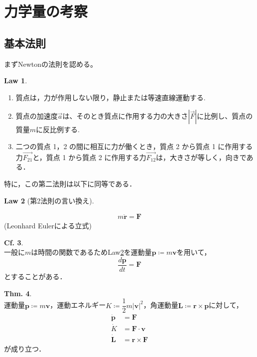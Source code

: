 \documentclass[dvipdfmx,uplatex]{jsarticle}
\theoremstyle{definition}
\newtheorem{law}{Law}[section]
\newtheorem{theo}[law]{Thm.}
\newtheorem{cf}[law]{Cf.}
\begin{document}
\section{力学量の考察}

\subsection{基本法則}
まずNewtonの法則を認める。
\begin{law}\mbox{}
\begin{enumerate}
\item 質点は，力が作用しない限り，静止または等速直線運動する.
\item 質点の加速度$\overrightarrow{a}$は、そのとき質点に作用する力の大きさ$\left|{\overrightarrow{F}}\right|$に比例し、質点の質量$m$に反比例する.
\item 二つの質点 1，2 の間に相互に力が働くとき，質点 2 から質点 1 に作用する力$\overrightarrow{F_{21}}$と，質点 1 から質点 2 に作用する力$\overrightarrow{F_{12}}$は，大きさが等しく，向きである．
\end{enumerate}
\end{law}
特に，この第二法則は以下に同等である．
\begin{law}[第2法則の言い換え]\label{law:2}

\begin{align}
m \ddot{\bm{r}} = \bm{F} \label{equation-of-motion}
\end{align}
(Leonhard Eulerによる立式)
\end{law}

\begin{cf}\label{cf:1.3}\mbox{}\\
  一般に$m$は時間の関数であるため\rm{Law}\ref{law:2}を運動量$\bm{p} \coloneqq m \bm{v}$を用いて，
  \begin{equation*}
    \frac{d\bm{p}}{dt} = \bm{F}
  \end{equation*}
  とすることがある．
\end{cf}

\begin{theo}\mbox{}\\
  運動量$\bm{p} \coloneqq m \bm{v}$，運動エネルギー$K \coloneqq \dfrac{1}{2} m |\bm{v}|^2$，角運動量$\bm{L} \coloneqq \bm{r} \times \bm{p}$に対して，
  \begin{align}
    \bm{\dot{p}} &= \bm{F} \label{eq:1.2}\\
    \dot{K} &= \bm{F} \cdot \bm{v} \label{eq:1.3} \\
    \bm{\dot{L}} &= \bm{r} \times \bm{F} \label{eq:1.4}
  \end{align}
  が成り立つ．
\end{theo}
\end{document}
